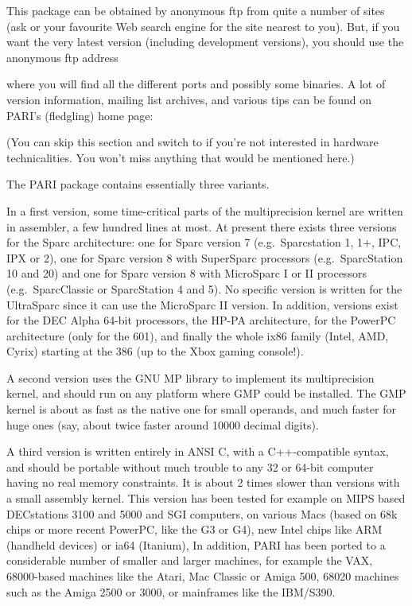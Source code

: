 
\noindent
This package can be obtained by anonymous ftp from quite a number of sites
(ask  or your favourite Web search engine for the site nearest to
you). But, if you want the very latest version (including development
versions), you should use the anonymous ftp address


\noindent
where you will find all the different ports and possibly some
binaries. A lot of version information, mailing list archives, and various
tips can be found on PARI's (fledgling) home page:

\kbd{\wwwsite}

 (You can skip this section and switch to
 if you're not interested in hardware technicalities. You
won't miss anything that would be mentioned here.)

The PARI package contains essentially three variants.

In a first version, some time-critical parts of the multiprecision kernel are
written in assembler, a few hundred lines at most. At present there exists
three versions for the Sparc architecture: one for Sparc version 7
(e.g.~Sparcstation 1, 1+, IPC, IPX or 2), one for Sparc version 8 with
SuperSparc processors (e.g.~SparcStation 10 and 20) and one for Sparc version
8 with MicroSparc I or II processors (e.g.~SparcClassic or SparcStation 4 and
5). No specific version is written for the UltraSparc since it can use the
MicroSparc II version. In addition, versions exist for the DEC Alpha 64-bit
processors, the HP-PA architecture, for the PowerPC architecture (only for
the 601), and finally the whole ix86 family (Intel, AMD, Cyrix) starting at
the 386 (up to the Xbox gaming console!).

A second version uses the GNU MP library to implement its multiprecision
kernel, and should run on any platform where GMP could be installed. The GMP
kernel is about as fast as the native one for small operands, and much faster
for huge ones (say, about twice faster around 10000 decimal digits).

A third version is written entirely in ANSI C, with a C++-compatible syntax,
and should be portable without much trouble to any 32 or 64-bit computer
having no real memory constraints. It is about 2 times slower than versions
with a small assembly kernel. This version has been tested for example on
MIPS based DECstations 3100 and 5000 and SGI computers, on various Macs
(based on 68k chips or more recent PowerPC, like the G3 or G4), new Intel
chips like ARM (handheld devices) or ia64 (Itanium), In addition, PARI has
been ported to a considerable number of smaller and larger machines, for
example the VAX, 68000-based machines like the Atari, Mac Classic or Amiga
500, 68020 machines such as the Amiga 2500 or 3000, or mainframes like the
IBM/S390.

